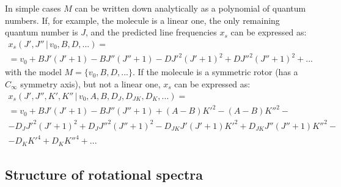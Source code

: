 \documentclass[11pt]{article}
\begin{document}
In simple cases $M$ can be written down analytically as a polynomial of quantum numbers. If, for example, the molecule is a linear one, the only remaining quantum number is $J$, and the predicted line frequencies $x_s$ can be expressed as:
\begin{multline}
\label{linear_eigenvalues}
x_s(J', J''\, |\, v_0, B, D, ...) = \\
= v_0 + BJ'(J'+1) - BJ''(J''+1) - D{J'}^2(J'+1)^2 + D{J''}^2(J''+1)^2 + ... 
\end{multline}
with the model $M = \{v_0, B, D, ...\}$. If the molecule is a symmetric rotor (has a $C_{\infty}$ symmetry axis), but not a linear one, $x_s$ can be expressed as:
\begin{multline}
\label{sym_eigenvalues}
x_s(J', J'', K', K''\, |\, v_0, A, B, D_J, D_{JK}, D_K, ...) = \\ =
v_0 + BJ'(J'+1) - BJ''(J''+1) + (A - B){K'}^2 - (A - B){K''}^2 - \\
- D_J{J'}^2(J'+1)^2 + D_J{J''}^2(J''+1)^2 - D_{JK}{J'}(J'+1){K'}^2 + D_{JK}{J''}(J''+1){K''}^2 - \\ - D_K{K'}^4 + D_K{K''}^4 + ...
\end{multline}


\subsection{Structure of rotational spectra}
\end{document}
